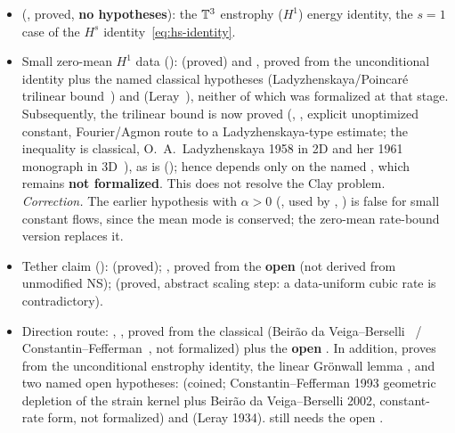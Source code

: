 \documentclass[11pt]{article}
\begin{document}
\begin{itemize}
\item {} (, proved, \textbf{no hypotheses}): the $\mathbb{T}^3$ enstrophy ($H^1$) energy identity, the $s=1$ case of the $H^s$ identity~\eqref{eq:hs-identity}.
\item Small zero-mean $H^1$ data ():  (proved) and , proved from the unconditional identity plus the named classical hypotheses  (Ladyzhenskaya/Poincar\'e trilinear bound~\cite{Ladyzhenskaya1963}) and  (Leray~\cite{Leray1934}), neither of which was formalized at that stage. Subsequently, the trilinear bound  is now proved (, , explicit unoptimized constant, Fourier/Agmon route to a Ladyzhenskaya-type estimate; the inequality is classical, O.~A.~Ladyzhenskaya 1958 in 2D and her 1961 monograph in 3D~\cite{Ladyzhenskaya1963}), as is  (); hence  depends only on the named , which remains \textbf{not formalized}. This does not resolve the Clay problem. \emph{Correction.} The earlier hypothesis  with $\alpha>0$ (, used by , ) is false for small constant flows, since the mean mode is conserved; the zero-mean rate-bound version replaces it.
\item Tether claim ():  (proved); ,  proved from the \textbf{open}  (not derived from unmodified NS);  (proved, abstract scaling step: a data-uniform cubic rate is contradictory).
\item Direction route: , , proved from the classical  (Beir\~ao da Veiga--Berselli~\cite{BdVB2002} / Constantin--Fefferman~\cite{CF1993}, not formalized) plus the \textbf{open} . In addition,  proves  from the unconditional enstrophy identity, the linear Gr\"onwall lemma , and two named open hypotheses:  (coined; Constantin--Fefferman 1993 geometric depletion of the strain kernel plus Beir\~ao da Veiga--Berselli 2002, constant-rate form, not formalized) and  (Leray 1934).  still needs the open .

\end{itemize}
\end{document}
